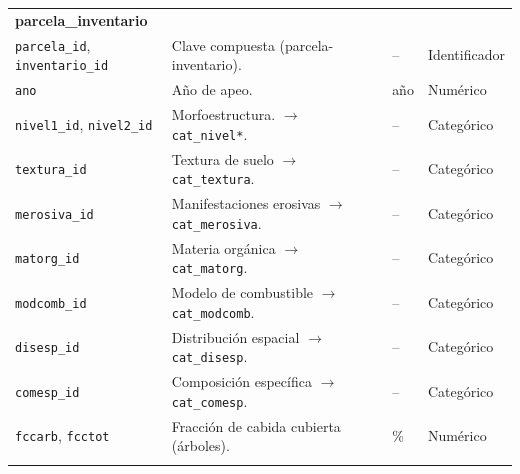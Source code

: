 \begin{longtable}{@{}p{2.8cm} p{6.8cm} p{2.2cm} p{2.2cm}@{}}
    \multicolumn{4}{l}{\textbf{parcela\_inventario}}                                                                                                                                               \\
    \texttt{parcela\_id}, \texttt{inventario\_id}                          & Clave compuesta (parcela-inventario).                          & --                           & Identificador         \\
    \texttt{ano}                                                           & Año de apeo.                                                   & año                          & Numérico              \\
    \texttt{nivel1\_id}, \texttt{nivel2\_id}                               & Morfoestructura. $\rightarrow$ \texttt{cat\_nivel*}.           & --                           & Categórico            \\
    \texttt{textura\_id}                                                   & Textura de suelo $\rightarrow$ \texttt{cat\_textura}.          & --                           & Categórico            \\
    \texttt{merosiva\_id}                                                  & Manifestaciones erosivas $\rightarrow$ \texttt{cat\_merosiva}. & --                           & Categórico            \\
    \texttt{matorg\_id}                                                    & Materia orgánica $\rightarrow$ \texttt{cat\_matorg}.           & --                           & Categórico            \\
    \texttt{modcomb\_id}                                                   & Modelo de combustible $\rightarrow$ \texttt{cat\_modcomb}.     & --                           & Categórico            \\
    \texttt{disesp\_id}                                                    & Distribución espacial $\rightarrow$ \texttt{cat\_disesp}.      & --                           & Categórico            \\
    \texttt{comesp\_id}                                                    & Composición específica $\rightarrow$ \texttt{cat\_comesp}.     & --                           & Categórico            \\
    \texttt{fccarb}, \texttt{fcctot}                                       & Fracción de cabida cubierta (árboles).                         & \%                           & Numérico              \\
    \addlinespace


\end{longtable}
